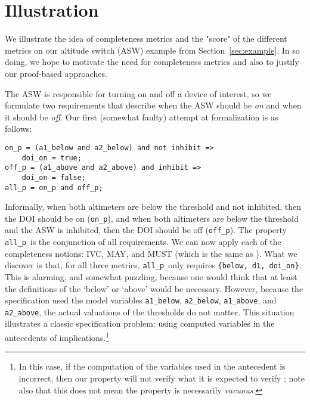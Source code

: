 \section{Illustration}
\label{sec:illust}

\newcommand{\allp}{\texttt{all\_p}}
\newcommand{\onp}{\texttt{on\_p}}
\newcommand{\offp}{\texttt{off\_p}}
\newcommand{\hystp}{\texttt{hyst\_p}}
\newcommand{\aonebelow}{\texttt{a1\_below}}
\newcommand{\atwobelow}{\texttt{a2\_below}}
\newcommand{\aoneabove}{\texttt{a1\_above}}
\newcommand{\atwoabove}{\texttt{a2\_above}}
\newcommand{\doion}{\texttt{doi\_on}}
\newcommand{\done}{\texttt{d1}}
\newcommand{\dtwo}{\texttt{d2}}
\newcommand{\abovehyst}{\texttt{above\_hyst}}
\newcommand{\inhibit}{\texttt{inhibit}}

We illustrate the idea of completeness metrics and the "score" of the different metrics on our altitude switch (ASW) example from Section~\ref{sec:example}.  In so doing, we hope to motivate the need for completeness metrics and also to justify our proof-based approaches.

The ASW is responsible for turning on and off a device of interest, so we formulate two requirements that describe when the ASW should be {\em on} and when it should be {\em off}.  Our first (somewhat faulty) attempt at formalization is as follows:

{\smaller
\begin{verbatim}
on_p = (a1_below and a2_below) and not inhibit =>
    doi_on = true;
off_p = (a1_above and a2_above) and inhibit =>
    doi_on = false;
all_p = on_p and off_p;
\end{verbatim}
}

\noindent Informally, when both altimeters are below the threshold and not inhibited, then the DOI should be on (\onp), and when both altimeters are below the threshold and the ASW is inhibited, then the DOI should be off (\offp).  The property \allp\ is the conjunction of all requirements.  We can now apply each of the completeness notions: IVC, MAY, and MUST (which is the same as \nondetcov).  What we discover is that, for all three metrics, \allp\ only requires \texttt{\{below, d1, doi\_on\}}.  This is alarming, and somewhat puzzling, because one would think that at least the definitions of the `below' or `above' would be necessary.  However, because the specification used the model variables \aonebelow, \atwobelow, \aoneabove, and \atwoabove, the actual valuations of the thresholds do not matter.  This situation illustrates a classic specification problem: using computed variables in the antecedents of implications.\footnote{In this case, if the computation of the variables used in the antecedent is incorrect, then our property will not verify what it is expected to verify ; note also that this does not mean the property is necessarily {\em vacuous}.}

